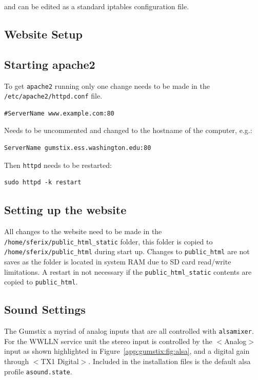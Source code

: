and can be edited as a standard iptables configuration file.

\subsection{Website Setup}
\label{app:gumstix:website}

\subsection*{Starting apache2}

To get \texttt{apache2} running only one change needs to be made in the \texttt{/etc/apache2/httpd.conf} file.

\begin{verbatim}
#ServerName www.example.com:80
\end{verbatim}

Needs to be uncommented and changed to the hostname of the computer, e.g.:

\begin{verbatim}
ServerName gumstix.ess.washington.edu:80
\end{verbatim}

Then \texttt{httpd} needs to be restarted:

\begin{verbatim}
sudo httpd -k restart
\end{verbatim}

\subsection*{Setting up the website}

All changes to the website need to be made in the \texttt{/home/sferix/public\_html\_static} folder, this folder is copied to \texttt{/home/sferix/public\_html} during start up. Changes to \texttt{public\_html} are not saves as the folder is located in system RAM due to SD card read/write limitations. A restart in not necessary if the \texttt{public\_html\_static} contents are copied to \texttt{public\_html}.

\subsection{Sound Settings}

The Gumstix a myriad of analog inputs that are all controlled with \texttt{alsamixer}.
For the WWLLN service unit the stereo input is controlled by the $<$Analog$>$ input as shown highlighted in Figure~\ref{app:gumstix:fig:alsa}, and a digital gain through $<$TX1 Digital$>$.
Included in the installation files is the default alsa profile \texttt{asound.state}.

